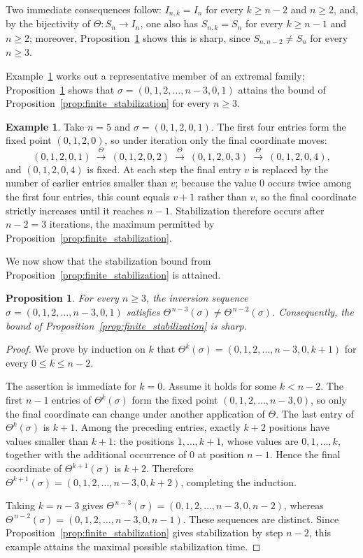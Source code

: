 \documentclass[11pt]{article}
\newtheorem{prop}[thm]{Proposition}
\theoremstyle{remark}
\theoremstyle{definition}
\newtheorem{example}[thm]{Example}
\begin{document}
Two immediate consequences follow: $I_{n,k}=I_n$ for every $k\geq n-2$ and $n\geq2$, and, by the bijectivity of $\Theta:S_n\to I_n$, one also has $S_{n,k}=S_n$ for every $k\geq n-1$ and $n\geq2$; moreover, Proposition~\ref{prop:sharp_stabilization} shows this is sharp, since $S_{n,n-2}\neq S_n$ for every $n\geq3$.

Example~\ref{ex:extremal_orbit} works out a representative member of an extremal
family; Proposition~\ref{prop:sharp_stabilization} shows that
$\sigma=(0,1,2,\ldots,n-3,0,1)$ attains the bound of
Proposition~\ref{prop:finite_stabilization} for every $n\ge3$.

\begin{example}\label{ex:extremal_orbit}
Take $n=5$ and $\sigma=(0,1,2,0,1)$. The first four entries form the fixed
point $(0,1,2,0)$, so under iteration only the final coordinate moves:
\[
(0,1,2,0,1)\ \xrightarrow{\ \Theta\ }\ (0,1,2,0,2)
\ \xrightarrow{\ \Theta\ }\ (0,1,2,0,3)
\ \xrightarrow{\ \Theta\ }\ (0,1,2,0,4),
\]
and $(0,1,2,0,4)$ is fixed. At each step the final entry $v$ is replaced by the
number of earlier entries smaller than $v$; because the value $0$ occurs twice
among the first four entries, this count equals $v+1$ rather than $v$, so the
final coordinate strictly increases until it reaches $n-1$. Stabilization therefore
occurs after $n-2=3$ iterations, the maximum permitted by
Proposition~\ref{prop:finite_stabilization}.
\end{example}

We now show that the stabilization bound from Proposition~\ref{prop:finite_stabilization} is attained.
\begin{prop}\label{prop:sharp_stabilization}
For every $n\geq3$, the inversion sequence $\sigma=(0,1,2,\ldots,n-3,0,1)$ satisfies $\Theta^{\,n-3}(\sigma)\neq\Theta^{\,n-2}(\sigma)$. Consequently, the bound of Proposition~\ref{prop:finite_stabilization} is sharp.
\end{prop}

\begin{proof}
We prove by induction on $k$ that $\Theta^k(\sigma)=(0,1,2,\ldots,n-3,0,k+1)$ for every $0\leq k\leq n-2$.

The assertion is immediate for $k=0$. Assume it holds for some $k<n-2$. The first $n-1$ entries of $\Theta^k(\sigma)$ form the fixed point $(0,1,2,\ldots,n-3,0)$, so only the final coordinate can change under another application of $\Theta$. The last entry of $\Theta^k(\sigma)$ is $k+1$. Among the preceding entries, exactly $k+2$ positions have values smaller than $k+1$: the positions $1,\ldots,k+1$, whose values are $0,1,\ldots,k$, together with the additional occurrence of $0$ at position $n-1$. Hence the final coordinate of $\Theta^{k+1}(\sigma)$ is $k+2$. Therefore $\Theta^{k+1}(\sigma)=(0,1,2,\ldots,n-3,0,k+2)$, completing the induction.

Taking $k=n-3$ gives $\Theta^{\,n-3}(\sigma)=(0,1,2,\ldots,n-3,0,n-2)$, whereas $\Theta^{\,n-2}(\sigma)=(0,1,2,\ldots,n-3,0,n-1)$. These sequences are distinct. Since Proposition~\ref{prop:finite_stabilization} gives stabilization by step $n-2$, this example attains the maximal possible stabilization time.
\end{proof}
\end{document}
